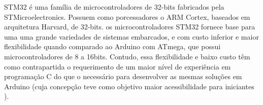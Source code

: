 STM32 é uma família de microcontroladores de 32-bits fabricados
pela STMicroelectronics. Possuem como porcessadores o ARM Cortex, baseados em arquitetura Harvard, de 32-bits. 
os microcontroladores STM32 fornece base para uma uma grande variedades de
sistemas embarcados, e com custo inferior e maior flexibilidade quando comparado
ao Arduino com ATmega, que possui microcontroladores de 8 a 16bits. Contudo,
essa flexibilidade e baixo custo têm como contrapartida o requerimento de um
maior nível de experiência em programação C do que o necessário para
desenvolver as mesmas soluções em Arduino (cuja concepção teve como objetivo
maior acessibilidade para iniciantes \cite{cortex_m3}).


